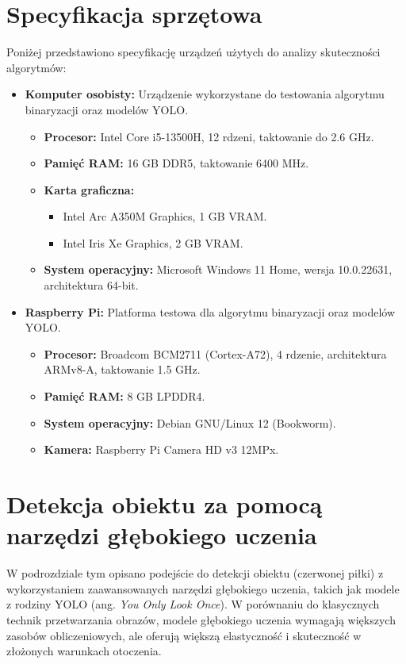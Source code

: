 \documentclass[a4paper,twoside,12pt]{book}
\begin{document}
\newpage

\section{Specyfikacja sprzętowa}
Poniżej przedstawiono specyfikację urządzeń użytych do analizy skuteczności algorytmów:
\begin{itemize}
    \item \textbf{Komputer osobisty:} Urządzenie wykorzystane do testowania algorytmu binaryzacji oraz modelów YOLO.
    \begin{itemize}
        \item \textbf{Procesor:} Intel Core i5-13500H, 12 rdzeni, taktowanie do 2.6 GHz.
        \item \textbf{Pamięć RAM:} 16 GB DDR5, taktowanie 6400 MHz.
        \item \textbf{Karta graficzna:} 
        \begin{itemize}
            \item Intel Arc A350M Graphics, 1 GB VRAM.
            \item Intel Iris Xe Graphics, 2 GB VRAM.
        \end{itemize}
        \item \textbf{System operacyjny:} Microsoft Windows 11 Home, wersja 10.0.22631, architektura 64-bit.
    \end{itemize}
    \item \textbf{Raspberry Pi:} Platforma testowa dla algorytmu binaryzacji oraz modelów YOLO.
    \begin{itemize}
        \item \textbf{Procesor:} Broadcom BCM2711 (Cortex-A72), 4 rdzenie, architektura ARMv8-A, taktowanie 1.5 GHz.
        \item \textbf{Pamięć RAM:} 8 GB LPDDR4.
        \item \textbf{System operacyjny:} Debian GNU/Linux 12 (Bookworm).
        \item \textbf{Kamera:} Raspberry Pi Camera HD v3 12MPx.
    \end{itemize}    
\end{itemize}

\section{Detekcja obiektu za pomocą narzędzi głębokiego uczenia}

W podrozdziale tym opisano podejście do detekcji obiektu (czerwonej piłki) z wykorzystaniem zaawansowanych narzędzi głębokiego uczenia, takich jak modele z rodziny YOLO (ang. \textit{You Only Look Once}).
W porównaniu do klasycznych technik przetwarzania obrazów, modele głębokiego uczenia wymagają większych zasobów obliczeniowych, ale oferują większą elastyczność i skuteczność w złożonych warunkach otoczenia.
\end{document}
